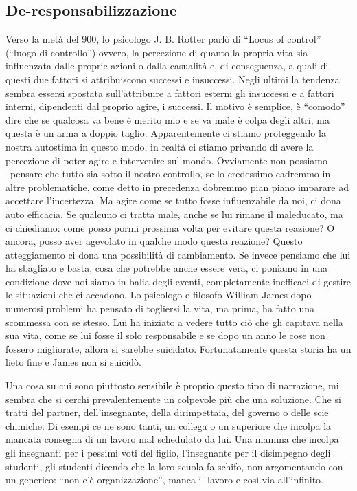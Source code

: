 \documentclass[12pt]{book} %
\begin{document}
\subsection[De{}-responsabilizzazione]{De-responsabilizzazione}
Verso la metà del 900, lo psicologo J. B. Rotter parlò di “Locus of control” (“luogo di controllo”) ovvero, la
percezione di quanto la propria vita sia influenzata dalle proprie azioni o dalla casualità e, di conseguenza, a quali
di questi due fattori si attribuiscono successi e insuccessi. Negli ultimi la tendenza sembra essersi spostata
sull'attribuire a fattori esterni gli insuccessi e a fattori interni, dipendenti dal proprio
agire, i successi. Il motivo è semplice, è “comodo” dire che se qualcosa va bene è merito mio e se va male è colpa
degli altri, ma questa è un arma a doppio taglio. Apparentemente ci stiamo proteggendo la nostra autostima in questo
modo, in realtà ci stiamo privando di avere la percezione di poter agire e intervenire sul mondo. Ovviamente non
possiamo \ pensare che tutto sia sotto il nostro controllo, se lo credessimo cadremmo in altre problematiche, come
detto in precedenza dobremmo pian piano imparare ad accettare l'incertezza. Ma agire come se tutto
fosse influenzabile da noi, ci dona auto efficacia. Se qualcuno ci tratta male, anche se lui rimane il maleducato, ma
ci chiediamo: come posso pormi prossima volta per evitare questa reazione? O ancora, posso aver agevolato in qualche
modo questa reazione? Questo atteggiamento ci dona una possibilità di cambiamento. Se invece pensiamo che lui ha
sbagliato e basta, cosa che potrebbe anche essere vera, ci poniamo in una condizione dove noi siamo in balia degli
eventi, completamente inefficaci di gestire le situazioni che ci accadono. Lo psicologo e filosofo William James dopo
numerosi problemi ha pensato di togliersi la vita, ma prima, ha fatto una scommessa con se stesso. Lui ha iniziato a
vedere tutto ciò che gli capitava nella sua vita, come se lui fosse il solo responsabile e se dopo un anno le cose non
fossero migliorate, allora si sarebbe suicidato. Fortunatamente questa storia ha un lieto fine e James non si suicidò.

Una cosa su cui sono piuttosto sensibile è proprio questo tipo di narrazione, mi sembra che si cerchi prevalentemente un
colpevole più che una soluzione. Che si tratti del partner, dell'insegnante, della dirimpettaia,
del governo o delle scie chimiche. Di esempi ce ne sono tanti, un collega o un superiore che incolpa la mancata
consegna di un lavoro mal schedulato da lui. Una mamma che incolpa gli insegnanti per i pessimi voti del figlio,
l'insegnante per il disimpegno degli studenti, gli studenti dicendo che la loro scuola fa schifo,
non argomentando con un generico: “non c'è organizzazione”, manca il lavoro e così via
all'infinito.
\end{document}
